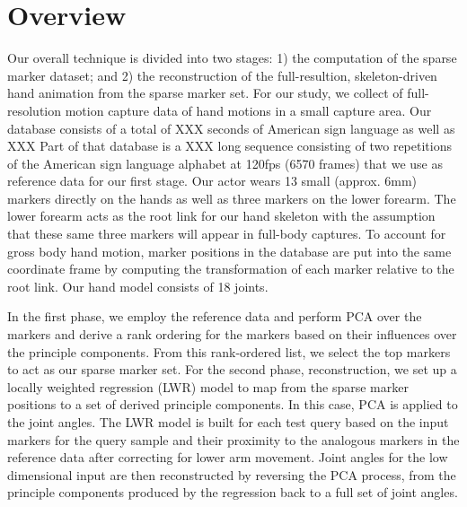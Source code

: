 
\section{Overview}

Our overall technique is divided into two stages: 1) the computation of the sparse marker dataset; and 2) the reconstruction of the full-resultion, skeleton-driven hand animation from the sparse marker set. 
For our study, we collect of full-resolution motion capture data of hand motions in a small capture area. Our database consists of a total of XXX seconds of American sign language as well as XXX %
Part of that database is a XXX long sequence consisting of two repetitions of the American sign language alphabet at 120fps (6570 frames) that we use as reference data for our first stage. 
Our actor wears 13 small (approx. 6mm) markers directly on the hands as well as three markers on the lower forearm. The lower forearm acts as the root link for our hand skeleton with the assumption that these same three markers will appear in full-body captures. 
To account for gross body hand motion, marker positions in the database are put into the same coordinate frame by computing the transformation of each marker relative to the root link. Our hand model consists of 18 joints. %

In the first phase, we employ the reference data and perform PCA over the markers and derive a rank ordering for the markers based on their influences over the principle components. From this rank-ordered list, we select the top markers to act as our sparse marker set.
For the second phase, reconstruction, we set up a locally weighted regression (LWR) model to map from the sparse marker positions to a set of derived principle components.  In this case, PCA is applied to the joint angles. The LWR model is built for each test query based on the input markers for the query sample and their proximity to the analogous markers in the reference data after correcting for lower arm movement.
%
Joint angles for the low dimensional input are then reconstructed by reversing the PCA process, from the principle components produced by the regression back to a full set of joint angles. 
